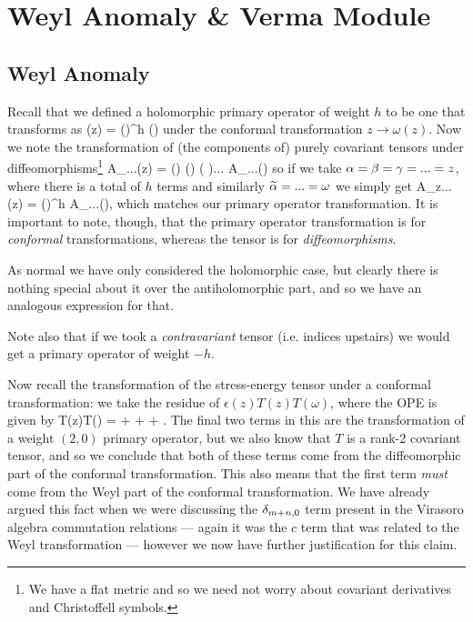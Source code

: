 \chapter{Weyl Anomaly \& Verma Module}

\section{Weyl Anomaly}

Recall that we defined a holomorphic primary operator of weight $h$ to be one that transforms as 
\bse 
    \cO(z) = \bigg(\bigg)^{h} \cO(\omega)
\ese 
under the conformal transformation $z\to \omega(z)$. Now we note the transformation of (the components of) purely covariant tensors under diffeomorphisms\footnote{We have a flat metric and so we need not worry about covariant derivatives and Christoffell symbols.}
\bse 
   A_{\a\beta\gamma...}(z) = \bigg(\frac{\p \widetilde{\a}}{\p\a}\bigg) \bigg(\frac{\p \widetilde{\beta}}{\p \beta}\bigg) \bigg( \frac{\p\widetilde{\gamma}}{\p\gamma}\bigg)...  A_{\widetilde{\a}\widetilde{\beta}\widetilde{\gamma}...}(\omega) 
\ese
so if we take $\alpha=\beta=\gamma = ... = z$, where there is a total of $h$ terms and similarly $\widetilde{\alpha} = ...= \omega$ we simply get 
\bse 
    A_{z...}(z) = \bigg(\bigg)^h A_{\omega...}(\omega),
\ese 
which matches our primary operator transformation. It is important to note, though, that the primary operator transformation is for \textit{conformal} transformations, whereas the tensor is for \textit{diffeomorphisms}. 

\br 
    As normal we have only considered the holomorphic case, but clearly there is nothing special about it over the antiholomorphic part, and so we have an analogous expression for that. 
\er 

\br 
    Note also that if we took a \textit{contravariant} tensor (i.e. indices upstairs) we would get a primary operator of weight $-h$.
\er 

Now recall the transformation of the stress-energy tensor under a conformal transformation: we take the residue of $\epsilon(z)T(z)T(\omega)$, where the OPE is given by
\bse 
    T(z)T(\omega) =  +  +  + . 
\ese 
The final two terms in this are the transformation of a weight $(2,0)$ primary operator, but we also know that $T$ is a rank-2 covariant tensor, and so we conclude that both of these terms come from the diffeomorphic part of the conformal transformation. This also means that the first term \textit{must} come from the Weyl part of the conformal transformation. We have already argued this fact when we were discussing the $\delta_{m+n,0}$ term present in the Virasoro algebra commutation relations --- again it was the $c$ term that was related to the Weyl transformation --- however we now have further justification for this claim.

